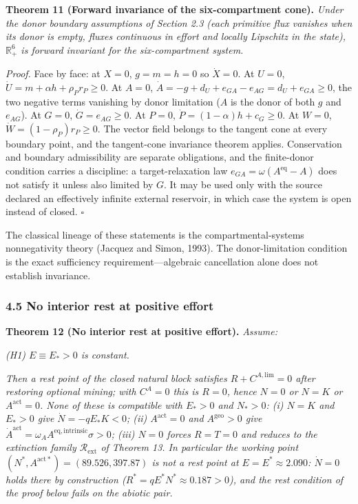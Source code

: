 \documentclass[11pt]{article}
\begin{document}
\textbf{Theorem 11 (Forward invariance of the six-compartment cone).}
\emph{Under the donor boundary assumptions of Section 2.3 (each
primitive flux vanishes when its donor is empty, fluxes continuous in
effort and locally Lipschitz in the state), \(\mathbb{R}^6_+\) is
forward invariant for the six-compartment system.}

\emph{Proof.} Face by face: at \(X = 0\), \(g = m = h = 0\) so \(\dot X = 0\). At \(U = 0\), \(\dot U = m + \alpha h + \rho_P r_P \ge 0\). At \(A = 0\), \(\dot A = -g + d_U + e_{GA} - e_{AG} = d_U + e_{GA} \ge 0\), the two negative terms vanishing by donor limitation (\(A\) is the donor of both \(g\) and \(e_{AG}\)). At \(G = 0\), \(\dot G = e_{AG} \ge 0\). At \(P = 0\), \(\dot P = (1-\alpha)h + c_G \ge 0\). At \(W = 0\), \(\dot W = (1-\rho_P)r_P \ge 0\). The vector field belongs to the tangent cone at every boundary point, and the tangent-cone invariance theorem applies. Conservation and boundary admissibility are separate obligations, and the finite-donor condition carries a discipline: a target-relaxation law \(e_{GA} = \omega(A^{\mathrm{eq}} - A)\) does not satisfy it unless also limited by \(G\). It may be used only with the source declared an effectively infinite external reservoir, in which case the system is open instead of closed. \ensuremath{\square}

The classical lineage of these statements is the compartmental-systems nonnegativity theory (Jacquez and Simon, 1993). The donor-limitation condition is the exact sufficiency requirement---algebraic cancellation alone does not establish invariance.

\subsubsection{4.5 No interior rest at positive
effort}\label{no-interior-rest-at-positive-effort}

\textbf{Theorem 12 (No interior rest at positive effort).}
\emph{Assume:}

\emph{(H1) \(E \equiv E_* > 0\) is constant.}

\emph{Then a rest point of the closed natural block satisfies
\(R + C^{A,\mathrm{lim}} = 0\) after restoring optional mining; with
\(C^A = 0\) this is \(R = 0\), hence \(N = 0\) or \(N = K\) or
\(A^{\mathrm{act}} = 0\). None of these is compatible with \(E_* > 0\)
and \(N_* > 0\): (i) \(N = K\) and \(E_* > 0\) give
\(\dot N = -qE_* K < 0\); (ii) \(A^{\mathrm{act}} = 0\) and
\(A^{\mathrm{geo}} > 0\) give
\(\dot A^{\mathrm{act}} = \omega_A A^{\mathrm{eq,intrinsic}} \sigma > 0\);
(iii) \(N = 0\) forces \(R = T = 0\) and reduces to the extinction
family \(\mathcal{R}_{\mathrm{ext}}\) of Theorem 13. In particular the
working point \((N^*, A^{\mathrm{act}*}) = (89.526, 397.87)\) is not a
rest point at \(E = E^* \approx 2.090\): \(\dot N = 0\) holds there by
construction (\(R^* = qE^*N^* \approx 0.187 > 0\)), and the rest
condition of the proof below fails on the abiotic pair.}
\end{document}
